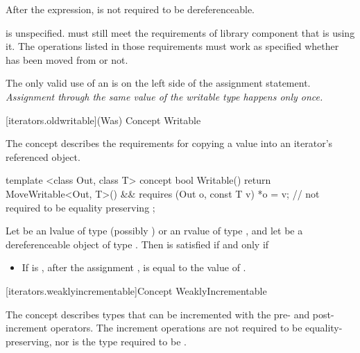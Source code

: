\begin{addedblock}
\pnum
After the expression,  is not required to be dereferenceable.

\pnum
{} is unspecified. \enternote {} must still meet the
requirements of  library component that is using it. The operations listed
in those requirements must work as specified whether  has been moved
from or not.\exitnote


\pnum
\enternote
The only valid use of an  is on the left side of the assignment statement.
\textit{Assignment through the same value of the writable type happens only once.}
\exitnote

{\color{oldclr}
[iterators.oldwritable]{(Was) Concept Writable}

\pnum
The  concept describes the requirements for copying a value into an iterator's
referenced object.

\begin{codeblock}
  template <class Out, class T>
  concept bool Writable() {
    return MoveWritable<Out, T>() &&
      requires (Out o, const T v) {
        *o = v; // not required to be equality preserving
      };
  }
\end{codeblock}

\pnum
Let  be an lvalue of type (possibly )  or an rvalue
of type , and let  be a dereferenceable object of type
. Then  is satisfied if and only if

\begin{itemize}
\item If  is , after the assignment ,
 is equal to the value of .
\end{itemize}
} %

[iterators.weaklyincrementable]{Concept WeaklyIncrementable}

\pnum
The  concept describes types that can be incremented with the pre-
and post-increment operators. The increment operations are not required to be equality-preserving,
nor is the type required to be .


\end{addedblock}
